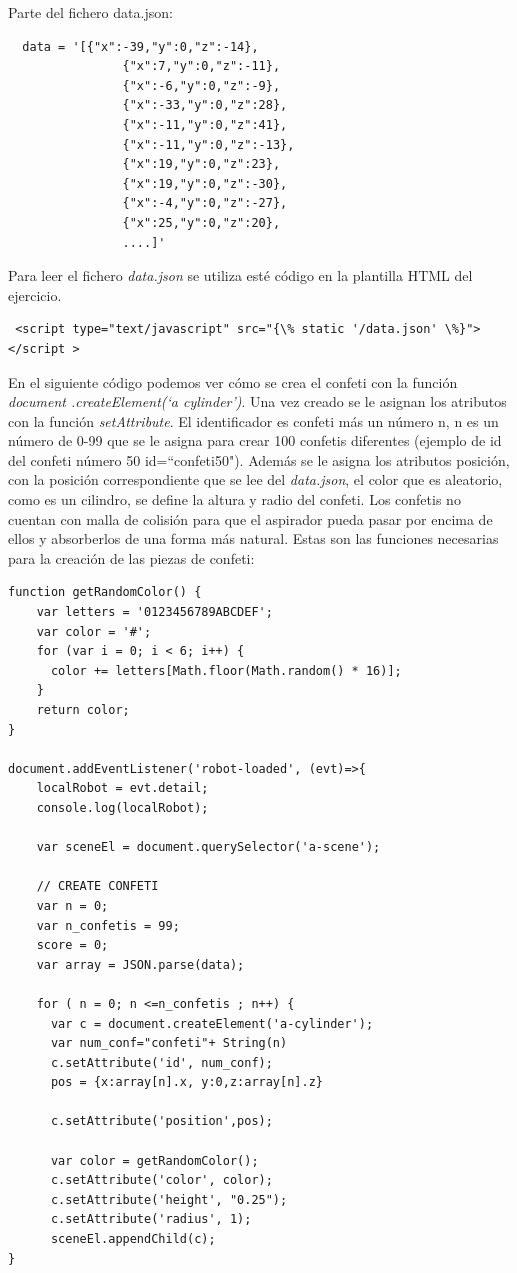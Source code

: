 Parte del fichero data.json: 
\begin{lstlisting}
  data = '[{"x":-39,"y":0,"z":-14},
                {"x":7,"y":0,"z":-11},
                {"x":-6,"y":0,"z":-9},
                {"x":-33,"y":0,"z":28},
                {"x":-11,"y":0,"z":41},
                {"x":-11,"y":0,"z":-13},
                {"x":19,"y":0,"z":23},
                {"x":19,"y":0,"z":-30},
                {"x":-4,"y":0,"z":-27},
                {"x":25,"y":0,"z":20},
                ....]'
 \end{lstlisting}


Para leer el fichero \textit{data.json} se utiliza esté código en la plantilla HTML del ejercicio.
\begin{lstlisting}
 <script type="text/javascript" src="{\% static '/data.json' \%}"></script > 
 \end{lstlisting}


En el siguiente código podemos ver cómo se crea el confeti con la función \textit{document .createElement(`a\- cylinder')}. Una vez creado se le asignan los atributos con la función  \textit{setAttribute}.  El identificador es confeti más un número  n, n es un número de 0-99 que se le asigna para crear 100 confetis diferentes (ejemplo de id del confeti número 50   id=``confeti50"). Además se le asigna los atributos posición, con la posición correspondiente que se lee del \textit{data.json}, el color que es  aleatorio, como es un cilindro, se define la altura y radio del confeti.
Los confetis no cuentan con malla de colisión para que el aspirador pueda pasar por encima de ellos y absorberlos de una forma más natural.
Estas son las funciones necesarias para la creación de las piezas de confeti: 
\begin{lstlisting}
function getRandomColor() {
    var letters = '0123456789ABCDEF';
    var color = '#';
    for (var i = 0; i < 6; i++) {
      color += letters[Math.floor(Math.random() * 16)];
    }
    return color;
}

document.addEventListener('robot-loaded', (evt)=>{
    localRobot = evt.detail;
    console.log(localRobot);

    var sceneEl = document.querySelector('a-scene');

    // CREATE CONFETI
    var n = 0;
    var n_confetis = 99;
    score = 0;
    var array = JSON.parse(data);

    for ( n = 0; n <=n_confetis ; n++) {
      var c = document.createElement('a-cylinder');
      var num_conf="confeti"+ String(n)
      c.setAttribute('id', num_conf);
      pos = {x:array[n].x, y:0,z:array[n].z}
    
      c.setAttribute('position',pos);
    
      var color = getRandomColor();
      c.setAttribute('color', color);
      c.setAttribute('height', "0.25");
      c.setAttribute('radius', 1);
      sceneEl.appendChild(c);
}
\end{lstlisting}

